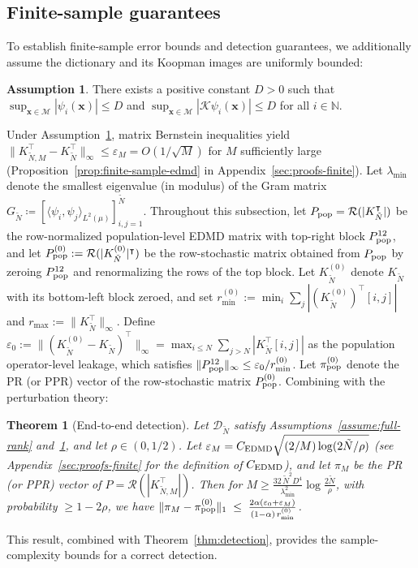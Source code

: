 \documentclass{article}
\theoremstyle{plain}
\newtheorem{theorem}{Theorem}
\theoremstyle{definition}
\newtheorem{assumption}{Assumption}
\newcommand{\norm}[1]{\| #1 \|}
\def\tp{\intercal}
\def\x{\mathbf{x}}
\def\Koop{\mathcal{K}}
\def\Dc{\mathcal{D}}
\def\Mc{\mathcal{M}}
\newcommand{\arXivtag}[1][]{#1}
\begin{document}
\subsection{Finite-sample guarantees}\label{subsec:end-to-end}
	\vspace{-0.2cm}
\arXivtag[To establish finite-sample error bounds and detection guarantees, we] additionally assume the dictionary and its Koopman images are uniformly bounded:
\begin{assumption}\label{assume:bounded-dict}
	There exists a positive constant $D > 0$ such that $\sup_{\x \in \Mc}|\psi_i(\x)| \leq D$ and $\sup_{\x \in \Mc}|\Koop\psi_i(\x)| \leq D$ for all $i \in \mathbb{N}$.
\end{assumption}
Under Assumption~\ref{assume:bounded-dict}, matrix Bernstein inequalities yield $\|K_{\tilde{N},M}^\tp - K_{\tilde{N}}^\tp\|_\infty \leq \varepsilon_M = O(1/\sqrt{M})$ for $M$ sufficiently large (Proposition~\ref{prop:finite-sample-edmd} in Appendix~\ref{sec:proofs-finite}). Let $\lambda_{\min}$ denote the smallest eigenvalue (in modulus) of the Gram matrix $G_{\tilde{N}} \coloneqq [\langle \psi_i, \psi_j\rangle_{L^2(\mu)}]_{i,j=1}^{\tilde{N}}$. Throughout this subsection, let $P_{\textnormal{pop}} = \mathcal{R}(|K_{\tilde{N}}^\tp|)$ be the row-normalized \arXivtag[population-level] EDMD matrix with top-right block $P^{12}_{\textnormal{pop}}$, and let $P^{(0)}_{\textnormal{pop}} := \mathcal{R}(|K^{(0)}_{\tilde{N}}|^\tp)$ be the row-stochastic matrix obtained from $P_{\textnormal{pop}}$ by zeroing $P^{12}_{\textnormal{pop}}$ and renormalizing \arXivtag[the rows of the top block]. Let $K_{\tilde{N}}^{(0)}$ denote $K_{\tilde{N}}$ with its bottom-left block zeroed, and set $r^{(0)}_{\min} := \min_i \sum_j |(K_{\tilde{N}}^{(0)})^\tp[i,j]|$ and $r_{\max} := \|K_{\tilde{N}}^\tp\|_\infty$. Define $\varepsilon_0 := \|(K_{\tilde{N}}^{(0)} - K_{\tilde{N}})^\tp\|_\infty = \max_{i \leq N}\sum_{j > N}|K_{\tilde{N}}^\tp[i,j]|$ as the population operator-level leakage, which satisfies $\|P^{12}_{\textnormal{pop}}\|_\infty\leq \varepsilon_0/r^{(0)}_{\min}$. Let $\pi_{\textnormal{pop}}^{(0)}$ denote the PR (or PPR) vector of the row-stochastic matrix $P^{(0)}_{\textnormal{pop}}$. Combining with the perturbation theory:

\begin{theorem}[End-to-end detection]\label{thm:end-to-end}
	Let $\Dc_{\tilde{N}}$ satisfy Assumptions~\ref{assume:full-rank} and~\ref{assume:bounded-dict}, and let $\rho \in (0,1/2)$. Let $\varepsilon_M = C_{\textnormal{EDMD}}\sqrt{(2/M)\log(2\tilde{N}/\rho)}$ (see Appendix~\ref{sec:proofs-finite} for the definition of $C_{\textnormal{EDMD}}$), and let ${\pi}_M$ be the PR (or PPR) vector of $P = \mathcal{R}(|K_{\tilde{N},M}^\tp|)$. Then for $M \geq \frac{32\,\tilde{N}^2 D^4}{\lambda_{\min}^2}\log\frac{2\tilde{N}}{\rho}$, with probability $\geq 1-2\rho$, we have $	\norm{{\pi}_M - \pi_{\textnormal{pop}}^{(0)}}_1 \;\leq\; \frac{2\alpha(\varepsilon_0 + \varepsilon_M)}{(1-\alpha)\,r^{(0)}_{\min}}$. 
\end{theorem}
This result, combined with Theorem~\ref{thm:detection}, provides the sample-complexity bounds for a correct detection.
\end{document}
